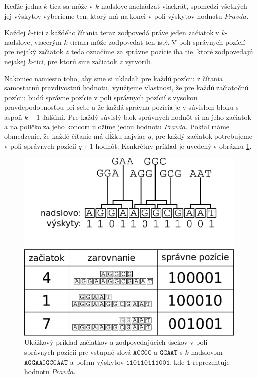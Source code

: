 Keďže jedna $k$-tica sa môže v $k$-nadslove nachádzať viackrát, spomedzi všetkých
jej výskytov vyberieme ten, ktorý má na konci v poli výskytov hodnotu $Pravda$.

Každej $k$-tici z každého čítania teraz zodpovedá práve jeden začiatok v $k$-nadslove,
viacerým $k$-ticiam môže zodpovedať ten istý. V poli správnych pozícií pre nejaký začiatok $z$
teda označíme za správne pozície iba tie, ktoré zodpovedajú nejakej $k$-tici, pre ktorú sme
začiatok $z$ vytvorili.

Nakoniec namiesto toho, aby sme si ukladali pre každú pozíciu z čítania samostatnú pravdivostnú
hodnotu, využijeme vlastnosť, že pre každú začiatočnú pozíciu budú
správne pozície v poli správnych pozícií s vysokou pravdepodobnosťou pri sebe a že každá správna pozícia je
v súvislom bloku s aspoň $k-1$ ďalšími. Pre každý súvislý blok správnych hodnôt si
na jeho začiatok a na políčko za jeho koncom uložíme jednu hodnotu $Pravda$.
Pokiaľ máme obmedzenie, že každé čítanie má dĺžku najviac $q$, pre každý začiatok
potrebujeme v poli správnych pozícií $q+1$ hodnôt. Konkrétny príklad je uvedený v obrázku \ref{obr:zar-struct}.

\begin{figure}

\centerline{\includegraphics[width=1\textwidth]{images/zarovnanie-3-3.pdf}}

\caption[Zarovnanie a štruktúry]{Ukážkový príklad začiatkov a zodpovedajúcich úsekov v poli správnych pozícií
pre vstupné slová $\texttt{ACCGC}$ a $\texttt{GGAAT}$ s $k$-nadslovom $\texttt{AGGAAGGCGAAT}$ a poľom výskytov
$\texttt{110110111001}$, kde $\texttt{1}$ reprezentuje hodnotu $Pravda$.}

\label{obr:zar-struct}

\end{figure}


